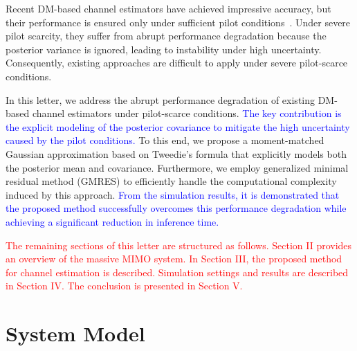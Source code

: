 \documentclass[lettersize,journal]{IEEEtran}
\newcommand{\tred}{\textcolor{red}}
\newcommand{\tblue}{\textcolor{blue}}
\begin{document}
Recent DM-based channel estimators have achieved impressive accuracy, but their performance is ensured only under sufficient pilot conditions~\cite{arvinteMIMOChannelEstimation2023,zhouGenerativeDiffusionModels2025}. Under severe pilot scarcity, they suffer from abrupt performance degradation because the posterior variance is ignored, leading to instability under high uncertainty. Consequently, existing approaches are difficult to apply under severe pilot-scarce conditions.





In this letter, we address the abrupt performance degradation of existing DM-based channel estimators under pilot-scarce conditions. \tblue{The key contribution is the explicit modeling of the posterior covariance to mitigate the high uncertainty caused by the pilot conditions.} To this end, we propose a moment-matched Gaussian approximation based on Tweedie's formula that explicitly models both the posterior mean and covariance. Furthermore, we employ generalized minimal residual method (GMRES) to efficiently handle the computational complexity induced by this approach. \tblue{From the simulation results, it is demonstrated that the proposed method successfully overcomes this performance degradation while achieving a significant reduction in inference time.}

\tred{
The remaining sections of this letter are structured as follows. Section II provides an overview of the massive MIMO system. In Section III, the proposed method for channel estimation is described. Simulation settings and results are described in Section IV. The conclusion is presented in Section V.
}



\section{System Model}
\end{document}
